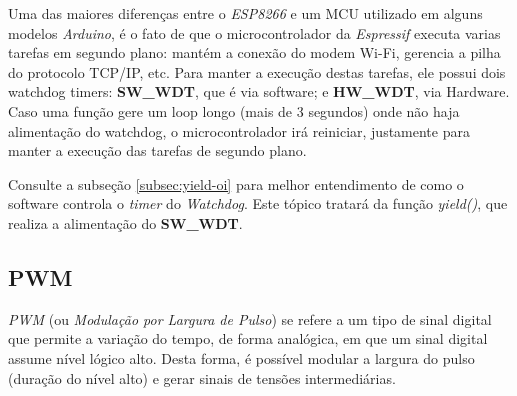 \documentclass[
12pt,				%
openany,			%
twoside,			%
a4paper,			%
english,			%
french,				%
spanish,			%
brazil,				%
]{abntex2}
\begin{document}
Uma das maiores diferenças entre o \textit{ESP8266} e um MCU utilizado em alguns modelos \textit{Arduino}, é o fato de que o microcontrolador da \textit{Espressif} executa varias tarefas em segundo plano: mantém a conexão do modem Wi-Fi, gerencia a pilha do protocolo TCP/IP, etc. Para manter a execução destas tarefas, ele possui dois watchdog timers: \textbf{\textsf{SW\_WDT}}, que é via software; e \textbf{\textsf{HW\_WDT}}, via Hardware. Caso uma função gere um loop longo (mais de 3 segundos) onde não haja alimentação do watchdog, o microcontrolador irá reiniciar, justamente para manter a execução das tarefas de segundo plano.

Consulte a subseção \ref{subsec:yield-oi} para melhor entendimento de como o software controla o \textit{timer} do \textit{Watchdog}. Este tópico tratará da função \emph{yield()}, que realiza a alimentação do \textbf{\textsf{SW\_WDT}}.

\subsection{PWM}

\textit{PWM} (ou \textit{Modulação por Largura de Pulso}) se refere a um tipo de sinal digital que permite a variação do tempo, de forma analógica, em que um sinal digital assume nível lógico alto. Desta forma, é possível modular a largura do pulso (duração do nível alto) e gerar sinais de tensões intermediárias. 

\vspace{10pt}
\end{document}
